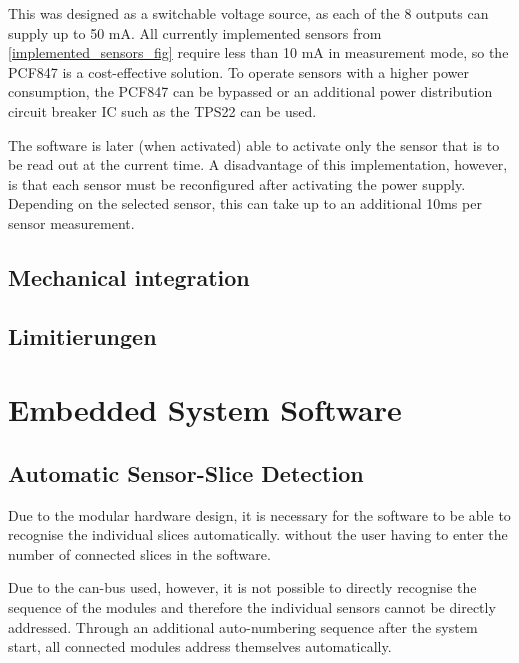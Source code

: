 \documentclass[conference]{IEEEtran}
\begin{document}
This was designed as a switchable voltage source, as each of the 8 outputs can supply up to 50 mA.
All currently implemented sensors from \ref{implemented_sensors_fig} require less than 10 mA in measurement mode, so the PCF847 is a cost-effective solution.
To operate sensors with a higher power consumption, the PCF847 can be bypassed or an additional power distribution circuit breaker IC such as the TPS22 can be used.



The software is later (when activated) able to activate only the sensor that is to be read out at the current time.
A disadvantage of this implementation, however, is that each sensor must be reconfigured after activating the power supply.
Depending on the selected sensor, this can take up to an additional 10ms per sensor measurement.





\subsection{Mechanical integration}

%
\subsection{Limitierungen}


\section{Embedded System Software}

\subsection{Automatic Sensor-Slice Detection}

Due to the modular hardware design, it is necessary for the software to be able to recognise the individual slices automatically.
without the user having to enter the number of connected slices in the software.

Due to the can-bus used, however, it is not possible to directly recognise the sequence of the modules and therefore the individual sensors cannot be directly addressed.
Through an additional auto-numbering sequence after the system start, all connected modules address themselves automatically.
\end{document}
